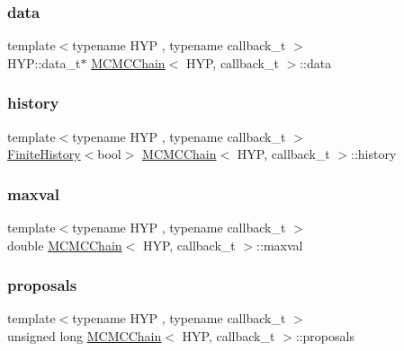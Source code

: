 \subsubsection{\texorpdfstring{data}{data}}
{\footnotesize\ttfamily template$<$typename H\+YP , typename callback\+\_\+t $>$ \\
H\+Y\+P\+::data\+\_\+t$\ast$ \hyperlink{class_m_c_m_c_chain}{M\+C\+M\+C\+Chain}$<$ H\+YP, callback\+\_\+t $>$\+::data}

\mbox{\label{class_m_c_m_c_chain_a83cb52eb26bdb914c0eb483f541972a9}} 
\subsubsection{\texorpdfstring{history}{history}}
{\footnotesize\ttfamily template$<$typename H\+YP , typename callback\+\_\+t $>$ \\
\hyperlink{class_finite_history}{Finite\+History}$<$bool$>$ \hyperlink{class_m_c_m_c_chain}{M\+C\+M\+C\+Chain}$<$ H\+YP, callback\+\_\+t $>$\+::history}

\mbox{\label{class_m_c_m_c_chain_a3b8d31f47d75503321b432eeac0bb13b}} 
\subsubsection{\texorpdfstring{maxval}{maxval}}
{\footnotesize\ttfamily template$<$typename H\+YP , typename callback\+\_\+t $>$ \\
double \hyperlink{class_m_c_m_c_chain}{M\+C\+M\+C\+Chain}$<$ H\+YP, callback\+\_\+t $>$\+::maxval}

\mbox{\label{class_m_c_m_c_chain_aec2cdd6a3e25447c7f34e31d0d98dbcb}} 
\subsubsection{\texorpdfstring{proposals}{proposals}}
{\footnotesize\ttfamily template$<$typename H\+YP , typename callback\+\_\+t $>$ \\
unsigned long \hyperlink{class_m_c_m_c_chain}{M\+C\+M\+C\+Chain}$<$ H\+YP, callback\+\_\+t $>$\+::proposals}

